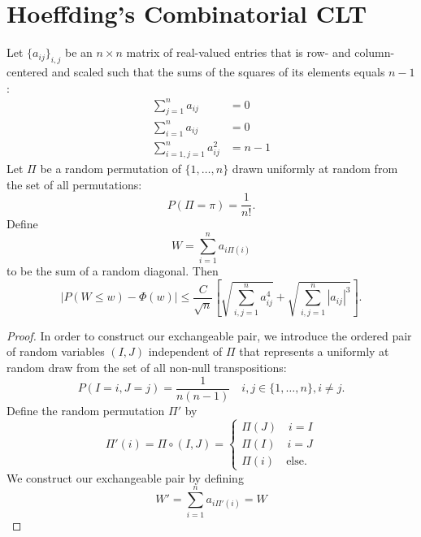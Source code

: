 \section{Hoeffding's Combinatorial CLT}
\begin{theorem}
  Let $\{a_{ij}\}_{i,j}$ be an $n \times n$ matrix of real-valued
  entries that is row- and column-centered and scaled such that the sums
  of the squares of its elements equals $n-1$:
  \begin{align}
    \sum_{j=1}^n a_{ij} &= 0 \\
    \sum_{i=1}^n a_{ij} &= 0 \\
    \sum_{i=1, j=1}^n a_{ij}^2 &= n-1
  \end{align}
  Let $\Pi$ be a random permutation of $\{1, \ldots, n\}$ drawn
  uniformly at random from the set of all permutations:
  \begin{equation}
    P(\Pi = \pi) = \frac{1}{n!}.
  \end{equation}
  Define
  \begin{equation}
    W = \sum_{i=1}^n a_{i\Pi(i)}
  \end{equation}
  to be the sum of a random diagonal.  Then
  \begin{equation}
    |P(W \leq w) - \Phi(w)| \leq
    \frac{C}{\sqrt{n}} \left [
      \sqrt{\sum_{i, j = 1}^n a_{ij}^4} +
      \sqrt{\sum_{i, j = 1}^n |a_{ij}|^3}
    \right ].
  \end{equation}
  \begin{proof}
    In order to construct our exchangeable pair, we introduce the
    ordered pair of random variables $(I, J)$ independent of $\Pi$ that
    represents a uniformly at random draw from the set of all non-null
    transpositions:
    \begin{equation}
      P(I = i, J = j) = \frac{1}{n(n-1)} \quad i, j \in \{1, \ldots, n\}, i \neq j.
    \end{equation}
    Define the random permutation $\Pi'$ by
    \begin{equation}
      \Pi'(i) = \Pi \circ (I, J) =
      \begin{cases}
        \Pi(J) \quad i = I \\
        \Pi(I) \quad i = J \\
        \Pi(i) \quad \text{else}.
      \end{cases}
    \end{equation}
    We construct our exchangeable pair by defining
    \begin{equation}
      W' = \sum_{i=1}^n a_{i\Pi'(i)} = W

\end{equation}
\end{proof}
\end{theorem}

